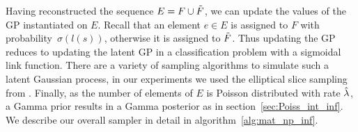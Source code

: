 \documentclass{statsoc}
\begin{document}
Having reconstructed the sequence $E = F \cup \tilde{F}$, we can update the values of the GP instantiated on $E$. 
Recall that an element $e \in E$ is assigned to $F$ with probability~$\sigma(l(s))$, otherwise it is
assigned to $\tilde{F}$. Thus updating the GP reduces to updating the latent GP in a classification problem with a sigmoidal link function.
There are a variety of sampling algorithms to simulate such a latent Gaussian process, in our experiments we used the elliptical slice sampling from 
\cite{murray2010}. Finally, as the number of elements of $E$ is Poisson distributed with rate $\hat{\lambda}$, a Gamma prior results in a Gamma posterior as 
in section~\ref{sec:Poiss_int_inf}.
We describe our overall sampler in detail in algorithm~\ref{alg:mat_np_inf}.



\end{document}
